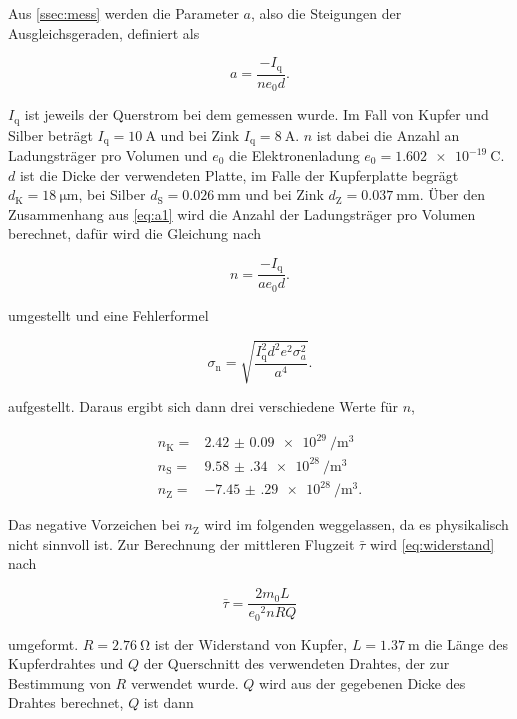 Aus \autoref{ssec:mess} werden die Parameter $a$, also die Steigungen der Ausgleichsgeraden, definiert als

\begin{equation}
    a = \frac{-I_\text{q}}{n e_0 d}.
    \label{eq:a1}
\end{equation}

$I_\text{q}$ ist jeweils der Querstrom bei dem gemessen wurde.
Im Fall von Kupfer und Silber beträgt $I_\text{q} = \SI{10}{\ampere}$ und bei Zink $I_\text{q} = \SI{8}{\ampere}$.
$n$ ist dabei die Anzahl an Ladungsträger pro Volumen und $e_0$ die Elektronenladung $e_0 = \SI{1.602e-19}{\coulomb}$. 
$d$ ist die Dicke der verwendeten Platte, im Falle der Kupferplatte begrägt $d_\text{K} = \SI{18}{\micro\meter}$, bei Silber $d_\text{S} = \SI{0.026}{\milli\meter}$ und bei Zink $d_\text{Z} = \SI{0.037}{\milli\meter}$.
Über den Zusammenhang aus \autoref{eq:a1} wird die Anzahl der Ladungsträger pro Volumen berechnet, dafür wird die Gleichung nach 

\begin{equation}
    n = \frac{-I_\text{q}}{a e_0 d}.
    \label{eq:n}
\end{equation}

umgestellt und eine Fehlerformel 

\begin{equation}
    \sigma _\text{n} = \sqrt{\frac {I_\text{q}^{2} d^{2} e^{2} \sigma_{a}^{2} }{a^{4}}}.
    \label{eq:n_fehler}
\end{equation}

aufgestellt.
Daraus ergibt sich dann drei verschiedene Werte für $n$,

\begin{align}
    n_\text{K} =& \SI{2.42(9)e29}{\per\cubic\meter} \\
    n_\text{S} =& \SI{9.58(34)e28}{\per\cubic\meter} \\
    n_\text{Z} =& \SI{-7.45(29)e28}{\per\cubic\meter}.
    \label{eq:n1}
\end{align}

Das negative Vorzeichen bei $n_\text{Z}$ wird im folgenden weggelassen, da es physikalisch nicht sinnvoll ist.
Zur Berechnung der mittleren Flugzeit $\bar{\tau}$ wird \autoref{eq:widerstand} nach

\begin{equation}
    \bar{\tau} = \frac{2m_0 L}{{e_0}^2 n R Q}
    \label{eq:tau}
\end{equation}

umgeformt.
$R = \SI{2.76}{\ohm}$ ist der Widerstand von Kupfer, $L = \SI{1.37}{\meter}$ die Länge des Kupferdrahtes und $Q$ der Querschnitt des verwendeten Drahtes, der zur Bestimmung von $R$ verwendet wurde.
$Q$ wird aus der gegebenen Dicke des Drahtes berechnet, $Q$ ist dann

